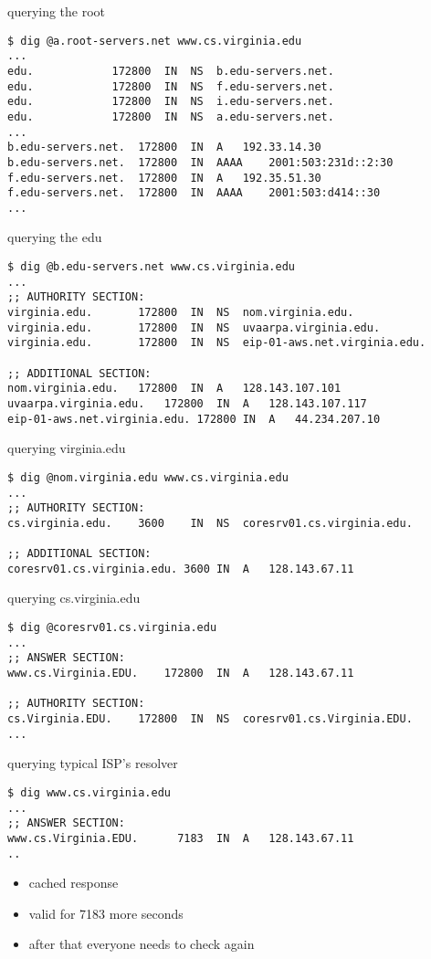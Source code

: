 
\begin{frame}[fragile]{querying the root}
\begin{Verbatim}[fontsize=\scriptsize]
$ dig @a.root-servers.net www.cs.virginia.edu
...
edu.			172800	IN	NS	b.edu-servers.net.
edu.			172800	IN	NS	f.edu-servers.net.
edu.			172800	IN	NS	i.edu-servers.net.
edu.			172800	IN	NS	a.edu-servers.net.
...
b.edu-servers.net.	172800	IN	A	192.33.14.30
b.edu-servers.net.	172800	IN	AAAA	2001:503:231d::2:30
f.edu-servers.net.	172800	IN	A	192.35.51.30
f.edu-servers.net.	172800	IN	AAAA	2001:503:d414::30
...
\end{Verbatim}
\end{frame}

\begin{frame}[fragile]{querying the edu}
\begin{Verbatim}[fontsize=\scriptsize]
$ dig @b.edu-servers.net www.cs.virginia.edu
...
;; AUTHORITY SECTION:
virginia.edu.		172800	IN	NS	nom.virginia.edu.
virginia.edu.		172800	IN	NS	uvaarpa.virginia.edu.
virginia.edu.		172800	IN	NS	eip-01-aws.net.virginia.edu.

;; ADDITIONAL SECTION:
nom.virginia.edu.	172800	IN	A	128.143.107.101
uvaarpa.virginia.edu.	172800	IN	A	128.143.107.117
eip-01-aws.net.virginia.edu. 172800 IN	A	44.234.207.10
\end{Verbatim}
\end{frame}
\begin{frame}[fragile]{querying virginia.edu}
\begin{Verbatim}[fontsize=\scriptsize]
$ dig @nom.virginia.edu www.cs.virginia.edu
...
;; AUTHORITY SECTION:
cs.virginia.edu.	3600	IN	NS	coresrv01.cs.virginia.edu.

;; ADDITIONAL SECTION:
coresrv01.cs.virginia.edu. 3600	IN	A	128.143.67.11
\end{Verbatim}
\end{frame}

\begin{frame}[fragile]{querying cs.virginia.edu}
\begin{Verbatim}[fontsize=\scriptsize]
$ dig @coresrv01.cs.virginia.edu
...
;; ANSWER SECTION:
www.cs.Virginia.EDU.	172800	IN	A	128.143.67.11

;; AUTHORITY SECTION:
cs.Virginia.EDU.	172800	IN	NS	coresrv01.cs.Virginia.EDU.
...
\end{Verbatim}
\end{frame}

\begin{frame}[fragile]{querying typical ISP's resolver}
\begin{Verbatim}[fontsize=\scriptsize]
$ dig www.cs.virginia.edu
...
;; ANSWER SECTION:
www.cs.Virginia.EDU.	  7183	IN	A	128.143.67.11
..
\end{Verbatim}
\begin{itemize}
\item cached response
\item valid for 7183  more seconds
\item after that everyone needs to check again
\end{itemize}
\end{frame}
